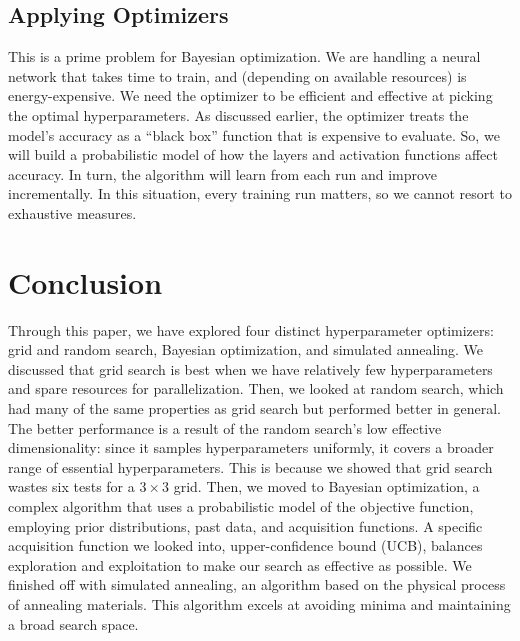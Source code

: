 \documentclass[stu,12pt,floatsintext]{apa7}
\begin{document}
\subsection{Applying Optimizers}

This is a prime problem for Bayesian optimization. We are handling a neural network that takes time to train, and (depending on available resources) is energy-expensive. We need the optimizer to be efficient and effective at picking the optimal hyperparameters. As discussed earlier, the optimizer treats the model's accuracy as a ``black box'' function that is expensive to evaluate. So, we will build a probabilistic model of how the layers and activation functions affect accuracy. In turn, the algorithm will learn from each run and improve incrementally. In this situation, every training run matters, so we cannot resort to exhaustive measures. 

\section{Conclusion}

Through this paper, we have explored four distinct hyperparameter optimizers: grid and random search, Bayesian optimization, and simulated annealing. We discussed that grid search is best when we have relatively few hyperparameters and spare resources for parallelization. Then, we looked at random search, which had many of the same properties as grid search but performed better in general. The better performance is a result of the random search's low effective dimensionality: since it samples hyperparameters uniformly, it covers a broader range of essential hyperparameters. This is because we showed that grid search wastes six tests for a \(3 \times 3\) grid. Then, we moved to Bayesian optimization, a complex algorithm that uses a probabilistic model of the objective function, employing prior distributions, past data, and acquisition functions. A specific acquisition function we looked into, upper-confidence bound (UCB), balances exploration and exploitation to make our search as effective as possible. We finished off with simulated annealing, an algorithm based on the physical process of annealing materials. This algorithm excels at avoiding minima and maintaining a broad search space. 
\end{document}
